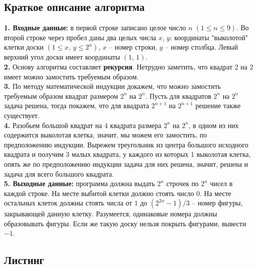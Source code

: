 \documentclass[a5paper, 10pt]{article}
\theoremstyle{definition}
\theoremstyle{plain}
\theoremstyle{remark}
\begin{document}
\subsection{Краткое описание алгоритма}
\textbf{1. Входные данные:} в первой строке записано целое число $n\,\, (1 \leq n \leq 9)$. Во второй строке через пробел даны два целых числа $x, \, y$: координаты "выколотой" клетки доски $( 1 \leq x, \, y \leq 2^n )$, $x$ -- номер строки, $y$ -- номер столбца. Левый верхний угол доски имеет координаты $(1, \, 1)$.\\
\textbf{2.} Основу алгоритма составляет \textbf{рекурсия}. Нетрудно заметить, что квадрат 2 на 2 имеет можно замостить требуемым образом. \\
\textbf{3.} По методу математической индукции докажем, что можно замостить требуемым образом квадрат размером $2^n$ на $2^n$. Пусть для квадратов $2^n$ на $2^n$ задача решена, тогда покажем, что для квадрата  $2^{n + 1}$ на $2^{n + 1}$ решение также существует. \\
\textbf{4.} Разобьем большой квадрат на 4 квадрата размера $2^n$ на $2^n$, в одном из них содержится выколотая клетка, значит, мы можем его замостить, по предположению индукции. Вырежем треугольник из центра большого исходного квадрата и получим 3 малых квадрата, у каждого из которых 1 выколотая клетка, опять же по предположению индукции задача для них решена, значит, решена и задача для всего большого квадрата. \\
\textbf{5. Выходные данные:}  программа должна выдать $2^n$ строчек по $2^n$ чисел в каждой строке. На месте выбитой клетки должно стоять число $0$. На месте остальных клеток должны стоять числа от $1$ до $(2^{2n} - 1) / 3$ -- номер фигуры, закрывающей данную клетку. Разумеется, одинаковые номера должны образовывать фигуры. Если же такую доску нельзя покрыть фигурами, вывести $-1$.

\subsection{Листинг}
\end{document}
